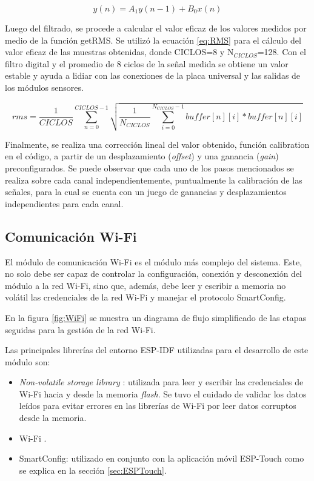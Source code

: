 \begin{equation}
	\label{eq:filtro}
	y\left( n \right) = A_1 y\left( n-1 \right) + B_0 x\left( n \right)
\end{equation}

Luego del filtrado, se procede a calcular el valor eficaz de los valores medidos por medio de la función getRMS. Se utilizó la ecuación \ref{eq:RMS} para el cálculo del valor eficaz de las muestras obtenidas, donde CICLOS=8 y N$_{CICLOS}$=128. Con el filtro digital y el promedio de 8 ciclos de la señal medida se obtiene un valor estable y ayuda a lidiar con las conexiones de la placa universal y las salidas de los módulos sensores.

\begin{equation}
	\label{eq:RMS}
rms=\frac{1}{CICLOS}\sum_{n=0}^{CICLOS-1}\sqrt{\frac{1}{N_{CICLOS}}\sum_{i=0}^{ N_{CICLOS}-1} buffer\left [ n \right ]\left [ i \right ]*buffer\left [ n \right ]\left [ i \right ]}
\end{equation}

Finalmente, se realiza una corrección lineal del valor obtenido, función calibration en el código, a partir de un desplazamiento (\textit{offset}) y una ganancia (\textit{gain}) preconfigurados. Se puede observar que cada uno de los pasos mencionados se realiza sobre cada canal independientemente, puntualmente la calibración de las señales, para la cual se cuenta con un juego de ganancias y desplazamientos independientes para cada canal.

\subsection{Comunicación Wi-Fi}

El módulo de comunicación Wi-Fi es el módulo más complejo del sistema. Este, no solo debe ser capaz de controlar la configuración, conexión y desconexión del módulo a la red Wi-Fi, sino que, además, debe leer y escribir a memoria no volátil las credenciales de la red Wi-Fi y manejar el protocolo SmartConfig. 

En la figura \ref{fig:WiFi} se muestra un diagrama de flujo simplificado de las etapas seguidas para la gestión de la red Wi-Fi. 

Las principales librerías del entorno ESP-IDF utilizadas para el desarrollo de este módulo son: 
\begin{itemize}
\item \textit{Non-volatile storage library} \citep{NVL}: utilizada para leer y escribir las credenciales de Wi-Fi hacia y desde la memoria \textit{flash}. Se tuvo el cuidado de validar los datos leídos para evitar errores en las librerías de Wi-Fi por leer datos corruptos desde la memoria.
\item Wi-Fi \citep{ESPIDF:WiFi}.
\item SmartConfig: utilizado en conjunto con la aplicación móvil ESP-Touch como se explica en la sección \ref{sec:ESPTouch}.
\end{itemize}

